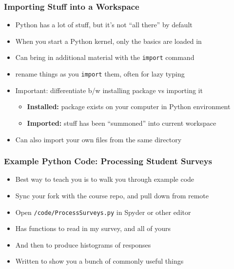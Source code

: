 \documentclass[aspectratio=169]{beamer}
\begin{document}
\begin{frame}
\frametitle{Importing Stuff into a Workspace}
\begin{itemize}
	\item Python has a lot of stuff, but it's not ``all there'' by default
	
	\item When you start a Python kernel, only the basics are loaded in
	
	\item <2->Can bring in additional material with the \texttt{import} command
	
	\item <2-> rename things as you \texttt{import} them, often for lazy typing
	
	\item <3->Important: differentiate b/w installing package vs importing it
	\begin{itemize}
		\item <3->\textbf{Installed:} package exists on your computer in Python environment
		
		\item <3->\textbf{Imported:} stuff has been ``summoned'' into current workspace
	\end{itemize}

	\item <4->Can also import your own files from the same directory
\end{itemize}
\end{frame}


\begin{frame}
\frametitle{Example Python Code: Processing Student Surveys}
\begin{itemize}
	\item Best way to teach you is to walk you through example code
	
	\item Sync your fork with the course repo, and pull down from remote
	
	\item Open \texttt{/code/ProcessSurveys.py} in Spyder or other editor
	
	\item <2->Has functions to read in my survey, and all of yours
	
	\item <2->And then to produce histograms of responses
	
	\item <3->Written to show you a bunch of commonly useful things
\end{itemize}
\end{frame}
\end{document}

